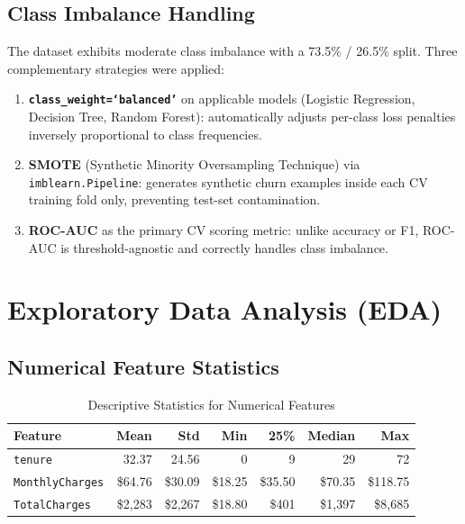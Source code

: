 \documentclass[12pt,a4paper]{article}
\begin{document}
\subsection{Class Imbalance Handling}

The dataset exhibits moderate class imbalance with a 73.5\% / 26.5\% split. Three complementary strategies were applied:
\begin{enumerate}[leftmargin=2em]
    \item \textbf{\texttt{class\_weight=`balanced'}} on applicable models (Logistic Regression, Decision Tree, Random Forest): automatically adjusts per-class loss penalties inversely proportional to class frequencies.
    \item \textbf{SMOTE} (Synthetic Minority Oversampling Technique) via \texttt{imblearn.Pipeline}: generates synthetic churn examples inside each CV training fold only, preventing test-set contamination.
    \item \textbf{ROC-AUC} as the primary CV scoring metric: unlike accuracy or F1, ROC-AUC is threshold-agnostic and correctly handles class imbalance.
\end{enumerate}

\section{Exploratory Data Analysis (EDA)}

\subsection{Numerical Feature Statistics}

\begin{table}[H]
\centering
\caption{Descriptive Statistics for Numerical Features}
\begin{tabular}{lrrrrrr}
    \toprule
    \textbf{Feature} & \textbf{Mean} & \textbf{Std} & \textbf{Min} & \textbf{25\%} & \textbf{Median} & \textbf{Max} \\
    \midrule
    \texttt{tenure}         & 32.37  & 24.56 & 0     & 9      & 29      & 72       \\
    \texttt{MonthlyCharges} & \$64.76 & \$30.09 & \$18.25 & \$35.50 & \$70.35 & \$118.75 \\
    \texttt{TotalCharges}   & \$2,283 & \$2,267 & \$18.80 & \$401  & \$1,397 & \$8,685  \\
    \bottomrule
\end{tabular}
\end{table}
\end{document}

